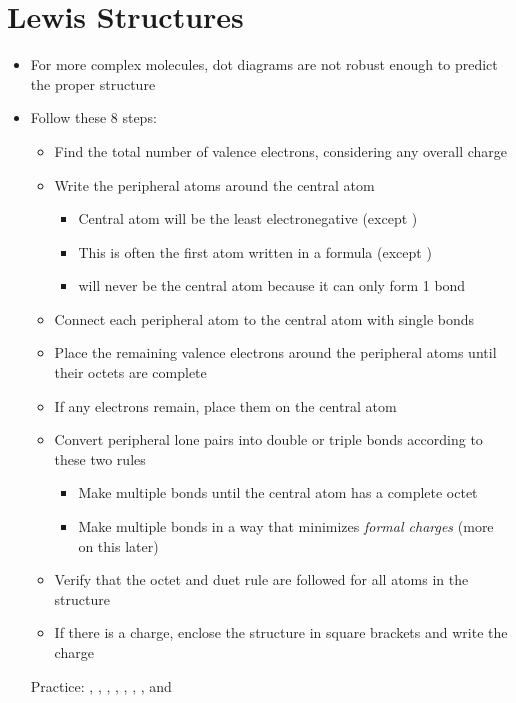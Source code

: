 \documentclass[12pt, openany, letterpaper]{memoir}
\begin{document}
\section{Lewis Structures}
\begin{itemize}
	\item For more complex molecules, dot diagrams are not robust enough to predict the proper structure
	\item Follow these 8 steps:
	      \begin{itemize}
		      \item Find the total number of valence electrons, considering any overall charge
		      \item Write the peripheral atoms around the central atom
		            \begin{itemize}
			            \item Central atom will be the least electronegative (except )
			            \item This is often the first atom written in a formula (except )
			            \item {} will never be the central atom because it can only form 1 bond
		            \end{itemize}
		      \item Connect each peripheral atom to the central atom with single bonds
		      \item Place the remaining valence electrons around the peripheral atoms until their octets are complete
		      \item If any electrons remain, place them on the central atom
		      \item Convert peripheral lone pairs into double or triple bonds according to these two rules
		            \begin{itemize}
			            \item Make multiple bonds until the central atom has a complete octet
			            \item Make multiple bonds in a way that minimizes \emph{formal charges} (more on this later)
		            \end{itemize}
		      \item Verify that the octet and duet rule are followed for all atoms in the structure
		      \item If there is a charge, enclose the structure in square brackets and write the charge
	      \end{itemize}

	      Practice: , , , , , , , and 
\end{itemize}
\end{document}
